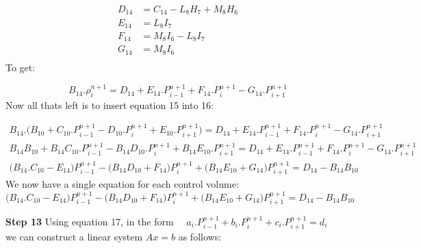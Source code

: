 \documentclass[11pt,letterpaper,titlepage]{article}
\begin{document}
\begin{equation*}
\begin{aligned}
D_{14} &=  C_{14}-L_8 H_7 +M_8 H_6 \\
E_{14} &=  L_8 I_7  \\
F_{14} &=  M_8 I_6-L_8 I_7   \\
G_{14} &=  M_8 I_6  \\
\end{aligned}
\end{equation*}
\newline
To get:

\begin{equation}
B_{14}.\rho_{i}^{n+1}=D_{14} +E_{14}.P_{i-1}^{n+1} + F_{14}.P_{i}^{n+1} - G_{14}.P_{i+1}^{n+1}
\end{equation}
\newline
Now all thats left is to insert equation 15 into 16:

\begin{equation*}
\begin{aligned}
B_{14}.\biggr( B_{10} + C_{10}. P_{i-1}^{n+1} - D_{10}. P_{i}^{n+1}+ E_{10}. P_{i+1}^{n+1} \biggr)=D_{14} +E_{14}.P_{i-1}^{n+1} + F_{14}.P_{i}^{n+1} - G_{14}.P_{i+1}^{n+1} \\
B_{14} B_{10} + B_{14}C_{10}. P_{i-1}^{n+1}-B_{14}D_{10}. P_{i}^{n+1}+B_{14} E_{10}. P_{i+1}^{n+1}=D_{14} +E_{14}.P_{i-1}^{n+1} + F_{14}.P_{i}^{n+1} - G_{14}.P_{i+1}^{n+1} \\
\biggr( B_{14}.C_{10}-E_{14} \biggr)P_{i-1}^{n+1}   - \biggr(B_{14}D_{10}+F_{14} \biggr)P_{i}^{n+1}+ \biggr(B_{14}E_{10}+G_{14} \biggr)P_{i+1}^{n+1} = D_{14}-B_{14}B_{10}
\end{aligned}
\end{equation*}
\newline
We now have a single equation for each control volume:
\begin{equation}
\biggr( B_{14}.C_{10}-E_{14} \biggr)P_{i-1}^{n+1}   - \biggr(B_{14}D_{10}+F_{14} \biggr)P_{i}^{n+1}+ \biggr(B_{14}E_{10}+G_{14} \biggr)P_{i+1}^{n+1} = D_{14}-B_{14}B_{10}
\end{equation}









\vspace{0.5cm}\noindent
\textbf{Step 13}\newline
Using equation 17, in the form $\quad a_i.P_{i-1}^{n+1} + b_i.P_{i}^{n+1} + c_i.P_{i+1}^{n+1} = d_i \quad $ we can construct a linear system $Ax=b$ as follows:
\end{document}
